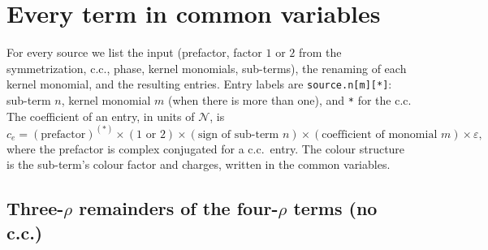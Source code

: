 \documentclass[10pt]{article}
\numberwithin{equation}{section}
\newcommand{\NN}{\mathcal N}
\newcommand{\lab}[1]{\texttt{#1}}
\begin{document}
\section{Every term in common variables}\label{C:sec:entries}

For every source we list the input (prefactor, factor $1$ or $2$ from the symmetrization, c.c., phase, kernel monomials, sub-terms), the renaming of each kernel monomial, and the resulting entries. Entry labels are \lab{source.n[m][*]}: sub-term $n$, kernel monomial $m$ (when there is more than one), and \lab{*} for the c.c. The coefficient of an entry, in units of $\NN$, is
\begin{equation}
c_e=(\text{prefactor})^{(*)}\times(1\text{ or }2)\times(\text{sign of sub-term }n)\times(\text{coefficient of monomial }m)\times\varepsilon,
\end{equation}
where the prefactor is complex conjugated for a c.c.\ entry. The colour structure is the sub-term's colour factor and charges, written in the common variables.

\subsection*{Three-$\rho$ remainders of the four-$\rho$ terms (no c.c.)}

\end{document}
